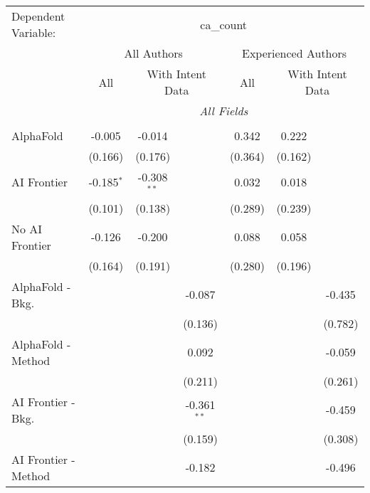 \begingroup
\centering
\begin{tabular}{lcccccc}
   \tabularnewline \midrule \midrule
   Dependent Variable: & \multicolumn{6}{c}{ca\_count}\\
 & \multicolumn{3}{c}{All Authors} & \multicolumn{3}{c}{Experienced Authors} \\
\cmidrule(lr){2-4} \cmidrule(lr){5-7}
 & \multicolumn{1}{c}{All} & \multicolumn{2}{c}{With Intent Data} & \multicolumn{1}{c}{All} & \multicolumn{2}{c}{With Intent Data} \\
\cmidrule(lr){2-2} \cmidrule(lr){3-4} \cmidrule(lr){5-5} \cmidrule(lr){6-7}
 & \multicolumn{6}{c}{\textit{All Fields}} \\ \\
   AlphaFold               & -0.005       & -0.014        &               & 0.342   & 0.222   &   \\   
                           & (0.166)      & (0.176)       &               & (0.364) & (0.162) &   \\   
   AI Frontier             & -0.185$^{*}$ & -0.308$^{**}$ &               & 0.032   & 0.018   &   \\   
                           & (0.101)      & (0.138)       &               & (0.289) & (0.239) &   \\   
   No AI Frontier          & -0.126       & -0.200        &               & 0.088   & 0.058   &   \\   
                           & (0.164)      & (0.191)       &               & (0.280) & (0.196) &   \\   
   AlphaFold - Bkg.        &              &               & -0.087        &         &         & -0.435\\   
                           &              &               & (0.136)       &         &         & (0.782)\\   
   AlphaFold - Method      &              &               & 0.092         &         &         & -0.059\\   
                           &              &               & (0.211)       &         &         & (0.261)\\   
   AI Frontier - Bkg.      &              &               & -0.361$^{**}$ &         &         & -0.459\\   
                           &              &               & (0.159)       &         &         & (0.308)\\   
   AI Frontier - Method    &              &               & -0.182        &         &         & -0.496\\   

\end{tabular}

